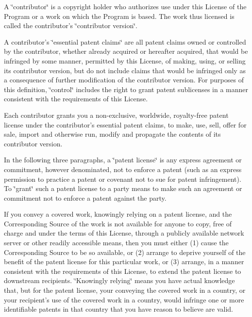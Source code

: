A \char`\"{}contributor\char`\"{} is a copyright holder who authorizes use under this License of the Program or a work on which the Program is based. The work thus licensed is called the contributor's \char`\"{}contributor version\char`\"{}.

A contributor's \char`\"{}essential patent claims\char`\"{} are all patent claims owned or controlled by the contributor, whether already acquired or hereafter acquired, that would be infringed by some manner, permitted by this License, of making, using, or selling its contributor version, but do not include claims that would be infringed only as a consequence of further modification of the contributor version. For purposes of this definition, \char`\"{}control\char`\"{} includes the right to grant patent sublicenses in a manner consistent with the requirements of this License.

Each contributor grants you a non-\/exclusive, worldwide, royalty-\/free patent license under the contributor's essential patent claims, to make, use, sell, offer for sale, import and otherwise run, modify and propagate the contents of its contributor version.

In the following three paragraphs, a \char`\"{}patent license\char`\"{} is any express agreement or commitment, however denominated, not to enforce a patent (such as an express permission to practice a patent or covenant not to sue for patent infringement). To \char`\"{}grant\char`\"{} such a patent license to a party means to make such an agreement or commitment not to enforce a patent against the party.

If you convey a covered work, knowingly relying on a patent license, and the Corresponding Source of the work is not available for anyone to copy, free of charge and under the terms of this License, through a publicly available network server or other readily accessible means, then you must either (1) cause the Corresponding Source to be so available, or (2) arrange to deprive yourself of the benefit of the patent license for this particular work, or (3) arrange, in a manner consistent with the requirements of this License, to extend the patent license to downstream recipients. \char`\"{}\-Knowingly relying\char`\"{} means you have actual knowledge that, but for the patent license, your conveying the covered work in a country, or your recipient's use of the covered work in a country, would infringe one or more identifiable patents in that country that you have reason to believe are valid.

